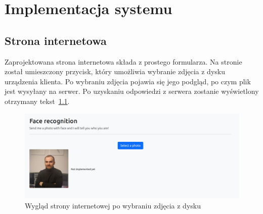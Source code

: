 \chapter{Implementacja systemu}


\section{Strona internetowa}

Zaprojektowana strona internetowa składa z prostego formularza.
Na stronie został umieszczony przycisk, który umożliwia wybranie zdjęcia z dysku urządzenia klienta.
Po wybraniu zdjęcia pojawia się jego podgląd, po czym plik jest wysyłany na serwer.
Po uzyskaniu odpowiedzi z serwera zostanie wyświetlony otrzymany tekst~\ref{fig:ja}.

\begin{figure}[H]
    \centering
    \includegraphics[width=1\textwidth]{./images/wyglad_frontowa_aplikacji}
    \caption{Wygląd strony internetowej po wybraniu zdjęcia z dysku}
    \customsource
    \label{fig:ja}
\end{figure}